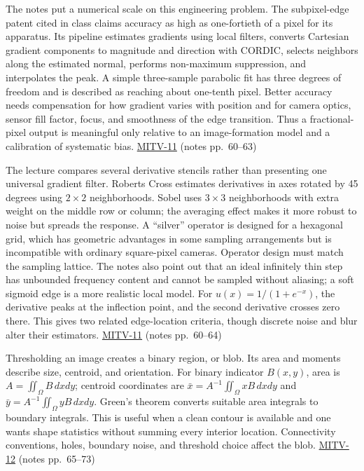 The notes put a numerical scale on this engineering problem. The subpixel-edge patent cited in class claims accuracy as high as one-fortieth of a pixel for its apparatus. Its pipeline estimates gradients using local filters, converts Cartesian gradient components to magnitude and direction with CORDIC, selects neighbors along the estimated normal, performs non-maximum suppression, and interpolates the peak. A simple three-sample parabolic fit has three degrees of freedom and is described as reaching about one-tenth pixel. Better accuracy needs compensation for how gradient varies with position and for camera optics, sensor fill factor, focus, and smoothness of the edge transition. Thus a fractional-pixel output is meaningful only relative to an image-formation model and a calibration of systematic bias. \hyperref[04-visual-computing-ii-ch036-mitv-11---edge-detection-subpixel-position-cordic-line-detection-us-6408109]{MITV-11} (notes pp.~60--63)

The lecture compares several derivative stencils rather than presenting one universal gradient filter. Roberts Cross estimates derivatives in axes rotated by 45 degrees using \(2\times2\) neighborhoods. Sobel uses \(3\times3\) neighborhoods with extra weight on the middle row or column; the averaging effect makes it more robust to noise but spreads the response. A ``silver'' operator is designed for a hexagonal grid, which has geometric advantages in some sampling arrangements but is incompatible with ordinary square-pixel cameras. Operator design must match the sampling lattice. The notes also point out that an ideal infinitely thin step has unbounded frequency content and cannot be sampled without aliasing; a soft sigmoid edge is a more realistic local model. For \(u(x)=1/(1+e^{-x})\), the derivative peaks at the inflection point, and the second derivative crosses zero there. This gives two related edge-location criteria, though discrete noise and blur alter their estimators. \hyperref[04-visual-computing-ii-ch036-mitv-11---edge-detection-subpixel-position-cordic-line-detection-us-6408109]{MITV-11} (notes pp.~60--64)

Thresholding an image creates a binary region, or blob. Its area and moments describe size, centroid, and orientation. For binary indicator \(B(x,y)\), area is \(A=\iint_\Omega B\,dxdy\); centroid coordinates are \(\bar{x}=A^{-1}\iint_\Omega xB\,dxdy\) and \(\bar{y}=A^{-1}\iint_\Omega yB\,dxdy\). Green's theorem converts suitable area integrals to boundary integrals. This is useful when a clean contour is available and one wants shape statistics without summing every interior location. Connectivity conventions, holes, boundary noise, and threshold choice affect the blob. \hyperref[04-visual-computing-ii-ch036-mitv-12---blob-analysis-binary-image-processing-greens-theorem-derivative-and-integral]{MITV-12} (notes pp.~65--73)

